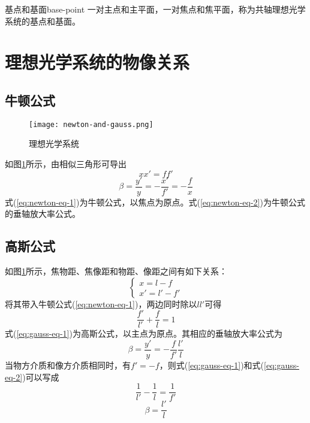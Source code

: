 \documentclass[cn,11pt]{elegantbook}
\begin{document}
\begin{definition}{基点和基面}{base-point}
	一对主点和主平面，一对焦点和焦平面，称为共轴理想光学系统的基点和基面。
\end{definition}

\section{理想光学系统的物像关系}
\subsection{牛顿公式}
\begin{figure}[htbp]
	\centering
	\texttt{[image: newton-and-gauss.png]}
	\caption{理想光学系统}
	\label{fig:newton-and-gauss}
\end{figure}

如图\ref{fig:newton-and-gauss}所示，由相似三角形可导出
\begin{equation}
xx'=ff'
\label{eq:newton-eq-1}
\end{equation}
\begin{equation}
\beta=\frac{y'}{y}=-\frac{x'}{f'}=-\frac{f}{x}
\label{eq:newton-eq-2}
\end{equation}
式(\ref{eq:newton-eq-1})为牛顿公式，以焦点为原点。式(\ref{eq:newton-eq-2})为牛顿公式的垂轴放大率公式。

\subsection{高斯公式}
如图\ref{fig:newton-and-gauss}所示，焦物距、焦像距和物距、像距之间有如下关系：
\begin{equation}
\begin{cases}
x=l-f\\
x'=l'-f'
\end{cases}
\end{equation}
将其带入牛顿公式(\ref{eq:newton-eq-1})，两边同时除以$ll'$可得
\begin{equation}
\frac{f'}{l'}+\frac{f}{l}=1
\label{eq:gauss-eq-1}
\end{equation}
式(\ref{eq:gauss-eq-1})为高斯公式，以主点为原点。其相应的垂轴放大率公式为
\begin{equation}
\beta=\frac{y'}{y}=-\frac{f}{f'}\frac{l'}{l}
\label{eq:gauss-eq-2}
\end{equation}
当物方介质和像方介质相同时，有$f'=-f$，则式(\ref{eq:gauss-eq-1})和式(\ref{eq:gauss-eq-2})可以写成
\begin{equation}
\frac{1}{l'}-\frac{1}{l}=\frac{1}{f'}
\end{equation}
\begin{equation}
\beta=\frac{l'}{l}
\end{equation}
\end{document}
